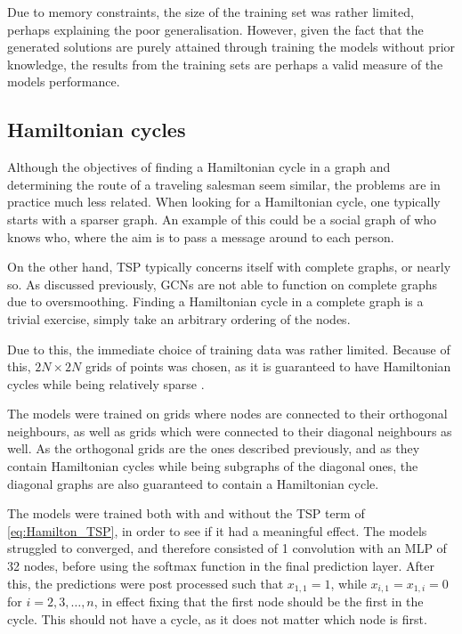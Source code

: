 Due to memory constraints, the size of the training set was rather limited, perhaps explaining the poor generalisation.
However, given the fact that the generated solutions are purely attained through training the models without prior knowledge, the results from the training sets are perhaps a valid measure of the models performance.

\subsection{Hamiltonian cycles}
Although the objectives of finding a Hamiltonian cycle in a graph and determining the route of a traveling salesman seem similar, the problems are in practice much less related.
When looking for a Hamiltonian cycle, one typically starts with a sparser graph.
An example of this could be a social graph of who knows who, where the aim is to pass a message around to each person.

On the other hand, TSP typically concerns itself with complete graphs, or nearly so.
As discussed previously, GCNs are not able to function on complete graphs due to oversmoothing.
Finding a Hamiltonian cycle in a complete graph is a trivial exercise, simply take an arbitrary ordering of the nodes.

Due to this, the immediate choice of training data was rather limited.
Because of this, $2N \times 2N$ grids of points was chosen, as it is guaranteed to have Hamiltonian cycles while being relatively sparse \cite{OEIS_hamilton}.

The models were trained on grids where nodes are connected to their orthogonal neighbours, as well as grids which were connected to their diagonal neighbours as well.
As the orthogonal grids are the ones described previously, and as they contain Hamiltonian cycles while being subgraphs of the diagonal ones, the diagonal graphs are also guaranteed to contain a Hamiltonian cycle.

The models were trained both with and without the TSP term of \eqref{eq:Hamilton_TSP}, in order to see if it had a meaningful effect.
The models struggled to converged, and therefore consisted of 1 convolution with an MLP of 32 nodes, before using the softmax function in the final prediction layer.
After this, the predictions were post processed such that $x_{1,1} = 1$, while $x_{i, 1} = x_{1, i} = 0$ for $i = 2, 3, \ldots, n$, in effect fixing that the first node should be the first in the cycle.
This should not have a cycle, as it does not matter which node is first.


